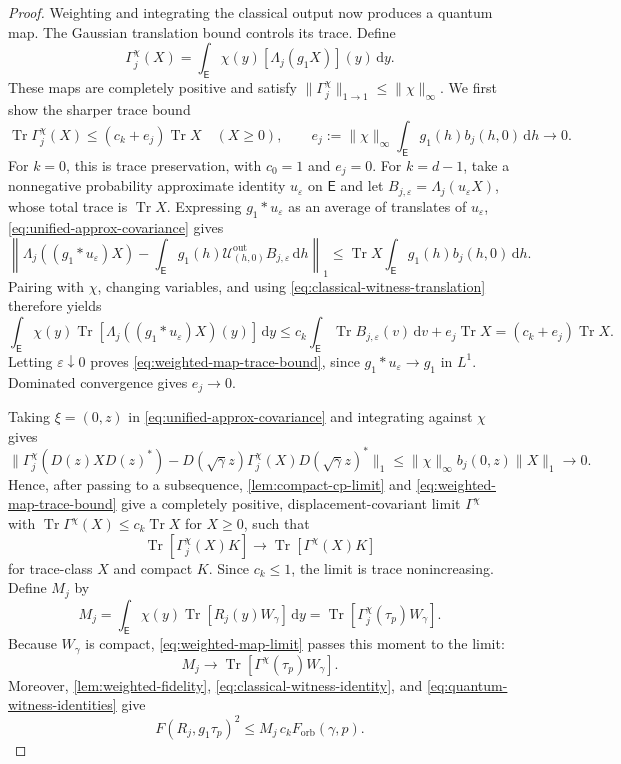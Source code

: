 \documentclass[11pt]{article}
\theoremstyle{remark}
\theoremstyle{plain}
\newcommand{\dd}{\mathrm d}
\newcommand{\Tr}{\operatorname{Tr}}
\newcommand{\Forb}{F_{\mathrm{orb}}}
\begin{document}
\begin{proof}
Weighting and integrating the classical output now
produces a quantum map. The Gaussian translation bound controls its
trace.  Define
\[
  \Gamma_j^\chi(X)
  =\int_{\mathsf E}\chi(y)[\Lambda_j(g_1X)](y)\,\dd y.
\]
These maps are completely positive and satisfy
\(\|\Gamma_j^\chi\|_{1\to1}\le\|\chi\|_\infty\).
We first show the sharper trace bound
\begin{equation}\label{eq:weighted-map-trace-bound}
  \Tr\Gamma_j^\chi(X)\le(c_k+e_j)\Tr X
  \quad(X\ge0),\qquad
  e_j:=\|\chi\|_\infty\int_{\mathsf E}g_1(h)b_j(h,0)\,\dd h
  \longrightarrow0.
\end{equation}
For \(k=0\), this is trace preservation, with \(c_0=1\) and \(e_j=0\).
For \(k=d-1\), take a nonnegative probability approximate identity
\(u_\varepsilon\) on \(\mathsf E\) and let
\(B_{j,\varepsilon}=\Lambda_j(u_\varepsilon X)\), whose total trace is
\(\Tr X\).  Expressing \(g_1*u_\varepsilon\) as an average of translates
of \(u_\varepsilon\), \eqref{eq:unified-approx-covariance} gives
\[
  \left\|\Lambda_j((g_1*u_\varepsilon)X)
  -\int_{\mathsf E}g_1(h)\mathcal U_{(h,0)}^{\mathrm{out}}
       B_{j,\varepsilon}\,\dd h\right\|_1
  \le \Tr X\int_{\mathsf E}g_1(h)b_j(h,0)\,\dd h.
\]
Pairing with \(\chi\), changing variables, and using
\eqref{eq:classical-witness-translation} therefore yields
\[
  \int_{\mathsf E}\chi(y)
    \Tr[\Lambda_j((g_1*u_\varepsilon)X)(y)]\,\dd y
  \le c_k\int_{\mathsf E}\Tr B_{j,\varepsilon}(v)\,\dd v+e_j\Tr X
  =(c_k+e_j)\Tr X.
\]
Letting \(\varepsilon\downarrow0\) proves
\eqref{eq:weighted-map-trace-bound}, since
\(g_1*u_\varepsilon\to g_1\) in \(L^1\).  Dominated convergence gives
\(e_j\to0\).

Taking \(\xi=(0,z)\) in \eqref{eq:unified-approx-covariance} and integrating
against \(\chi\) gives
\[
 \|\Gamma_j^\chi(D(z)XD(z)^*)
   -D(\sqrt\gamma z)\Gamma_j^\chi(X)D(\sqrt\gamma z)^*\|_1
 \le\|\chi\|_\infty b_j(0,z)\|X\|_1\longrightarrow0.
\]
Hence, after passing to a subsequence, \cref{lem:compact-cp-limit} and
\eqref{eq:weighted-map-trace-bound} give a completely positive,
displacement-covariant limit \(\Gamma^\chi\) with
\(\Tr\Gamma^\chi(X)\le c_k\Tr X\) for \(X\ge0\), such that
\begin{equation}\label{eq:weighted-map-limit}
  \Tr[\Gamma_j^\chi(X)K]
  \longrightarrow\Tr[\Gamma^\chi(X)K]
\end{equation}
for trace-class \(X\) and compact \(K\).  Since \(c_k\le1\), the limit is
trace nonincreasing.
Define \(M_j\) by
\[
  M_j
  =\int_{\mathsf E}\chi(y)\Tr[R_j(y)W_\gamma] \,\dd y
  =\Tr[\Gamma_j^\chi(\tau_p)W_\gamma].
\]
Because \(W_\gamma\) is compact,
\eqref{eq:weighted-map-limit} passes this moment to the limit:
\begin{equation}\label{eq:moment-limit}
  M_j\longrightarrow\Tr[\Gamma^\chi(\tau_p)W_\gamma].
\end{equation}
Moreover, \cref{lem:weighted-fidelity},
\eqref{eq:classical-witness-identity}, and
\eqref{eq:quantum-witness-identities} give
\begin{equation}\label{eq:unified-fidelity-to-moment}
  F(R_j,g_1\tau_p)^2
  \le M_j\,c_k\Forb(\gamma,p).
\end{equation}


\end{proof}
\end{document}
